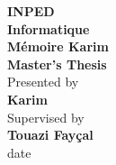 \begin{titlepage}
\begin{center}
    \vspace*{2cm}
    \textbf{\Huge INPED}\\
    \vspace{0.5cm}
    \textbf{\Large Informatique}\\
    \vspace{2cm}
    \textbf{\huge Mémoire Karim}\\
    \vspace{1.5cm}
    \textbf{\Large Master's Thesis}\\
    \vspace{2cm}
    \large Presented by\\
    \textbf{\large Karim}\\
    \vspace{1cm}
    \large Supervised by\\
    \textbf{\large Touazi Fayçal}\\
    \vspace{2cm}
    \large {{date}}\\
    \vfill
\end{center}
\end{titlepage}